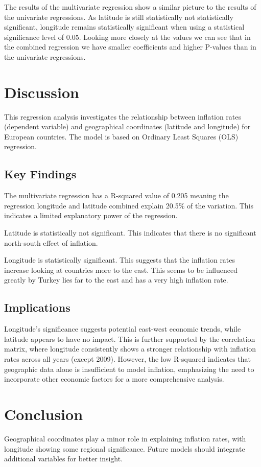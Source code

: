 \documentclass{article}
\begin{document}
    The results of the multivariate regression show a similar picture to the results of the univariate regressions. As latitude is still statistically not statistically significant, longitude remains statistically significant when using a statistical significance level of 0.05. Looking more closely at the values we can see that in the combined regression we have smaller coefficients and higher P-values than in the univariate regressions.
    
    \section{Discussion}
    This regression analysis investigates the relationship between inflation rates (dependent variable) and geographical coordinates (latitude and longitude) for European countries. The model is based on Ordinary Least Squares (OLS) regression.
    
    \subsection{Key Findings}

    The multivariate regression has a R-squared value of 0.205 meaning the regression longitude and latitude combined explain 20.5\% of the variation. This indicates a limited explanatory power of the regression.

    Latitude is statistically not significant. This indicates that there is no significant north-south effect of inflation.

    Longitude is statistically significant. This suggests that the inflation rates increase looking at countries more to the east. This seems to be influenced greatly by Turkey lies far to the east and has a very high inflation rate.

    \subsection{Implications}
    Longitude's significance suggests potential east-west economic trends, while latitude appears to have no impact. This is further supported by the correlation matrix, where longitude consistently shows a stronger relationship with inflation rates across all years (except 2009). However, the low R-squared indicates that geographic data alone is insufficient to model inflation, emphasizing the need to incorporate other economic factors for a more comprehensive analysis.

    \section{Conclusion}
    Geographical coordinates play a minor role in explaining inflation rates, with longitude showing some regional significance. Future models should integrate additional variables for better insight.
\end{document}
